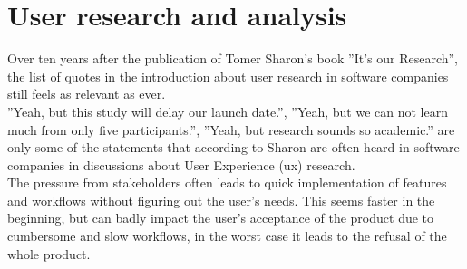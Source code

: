 %
\chapter{User research and analysis}
\label{chap:research}


Over ten years after the publication of Tomer Sharon's book ''It's our Research'', the list of quotes in the introduction about user research in software companies still feels as relevant as ever.
\\
''Yeah, but this study will delay our launch date.'', ''Yeah, but we can not learn much from only five participants.'', ''Yeah, but research sounds so academic.'' \cite[p. 4]{Sharon:2012mk} are only some of the statements that according to Sharon are often heard in software companies in discussions about User Experience (\Gls{ux}) research.
\\
The pressure from stakeholders often leads to quick implementation of features and workflows without figuring out the user's needs.
This seems faster in the beginning, but can badly impact the user's acceptance of the product due to cumbersome and slow workflows,
in the worst case it leads to the refusal of the whole product.

